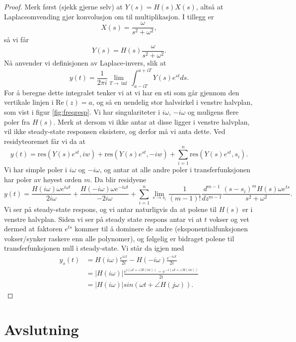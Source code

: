 \documentclass{article}
\begin{document}
\begin{proof}
    Merk først (sjekk gjerne selv) at $Y(s) = H(s) X(s)$, altså at Laplaceomvending gjør konvolusjon om til multiplikasjon. I tillegg er \[
        X(s) = \frac{\omega}{s^2 + \omega^2},
    \] så vi får 
    \[
        Y(s) = H(s) \frac{\omega}{s^2 + \omega^2}.
    \]
    Nå anvender vi definisjonen av Laplace-invers, slik at
    \[
     y(t) = \frac{1}{2\pi i} \lim_{T\to\inf} \int_{a-iT}^{a+iT} Y(s) e^{st} ds.
    \]
    For å beregne dette integralet tenker vi at vi har en sti som går gjennom den vertikale linjen i $\mathrm{Re}(z) = a$, og så en uendelig stor halvsirkel i venstre halvplan, som vist i figur \ref{fig:freqresp}. Vi har singulariteter i $i\omega$, $-i\omega$ og muligens flere poler fra $H(s)$. Merk at dersom vi ikke antar at disse ligger i venstre halvplan, vil ikke steady-state responsen eksistere, og derfor må vi anta dette. Ved residyteoremet får vi da at
    \[
    y(t) = \mathrm{res}(Y(s)e^{st}, iw) + \mathrm{res}(Y(s)e^{st}, -iw) + \sum_{i = 1}^n \mathrm{res}(Y(s)e^{st}, s_i).    
    \]
    Vi har simple poler i $i\omega$ og $-i\omega$, og antar at alle andre poler i transferfunksjonen har poler av høyest orden $m$. Da blir residyene 
    \[
    y(t) = \frac{H(i\omega)\omega e^{i\omega t}}{2i\omega} + \frac{H(-i\omega)\omega e^{-i\omega t}}{-2i\omega} + \sum_{i = 1}^n \lim_{s \to s_i} \frac{1}{(m  - 1)!} \frac{d^{m - 1}}{dz^{m  -1}} \frac{(s-s_i)^m H(s)\omega e^{ts}}{s^2 + \omega^2}.
    \]
    Vi ser på steady-state respons, og vi antar naturligvis da at polene til $H(s)$ er i venstre halvplan. Siden vi ser på steady state respons antar vi at $t$ vokser og vet dermed at faktoren $e^{ts}$ kommer til å dominere de andre (eksponentialfunksjonen vokser/synker raskere enn alle polynomer), og følgelig er bidraget polene til transferfunksjonen null i steady-state. Vi står da igjen med
    \begin{align}
        y_s(t) & = H(i\omega)\frac{e^{i\omega t}}{2i} - H(-i\omega)\frac{e^{-i\omega t}}{2i} \\
        & = |H(i\omega)| \frac{e^{i(\omega t + \angle H(iw))} - e^{-i(\omega t + \angle H(iw))}}{2i} \\
        & = |H(i\omega)| sin(\omega t + \angle H(j \omega)).
    \end{align}
\end{proof}

\section{Avslutning}
\end{document}
